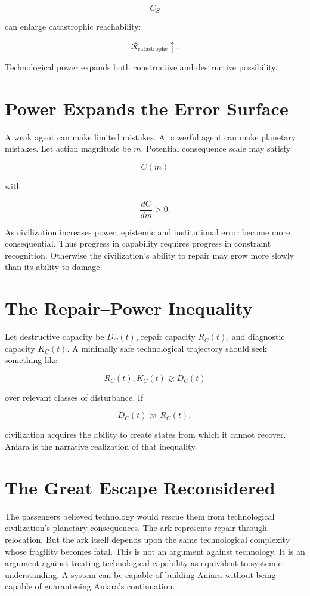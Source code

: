 \documentclass[11pt,oneside]{book}
\theoremstyle{definition}
\theoremstyle{remark}
\newcommand{\R}{\mathcal{R}}
\begin{document}
\[
C_S
\]

can enlarge catastrophic reachability:

\[
\R_{\mathrm{catastrophe}}\uparrow.
\]

Technological power expands both constructive and destructive possibility.

\section{Power Expands the Error Surface}

A weak agent can make limited mistakes. A powerful agent can make planetary mistakes. Let action
magnitude be \(m\). Potential consequence scale may satisfy

\[
C(m)
\]

with

\[
\frac{dC}{dm}>0.
\]

As civilization increases power, epistemic and institutional error become more consequential. Thus
progress in capability requires progress in constraint recognition. Otherwise the civilization's
ability to repair may grow more slowly than its ability to damage.

\section{The Repair--Power Inequality}

Let destructive capacity be \(D_C(t)\), repair capacity \(R_C(t)\), and diagnostic capacity
\(K_C(t)\). A minimally safe technological trajectory should seek something like

\[
R_C(t),K_C(t) \gtrsim D_C(t)
\]

over relevant classes of disturbance. If

\[
D_C(t)\gg R_C(t),
\]

civilization acquires the ability to create states from which it cannot recover. Aniara is the
narrative realization of that inequality.

\section{The Great Escape Reconsidered}

The passengers believed technology would rescue them from technological civilization's planetary
consequences. The ark represents repair through relocation. But the ark itself depends upon the same
technological complexity whose fragility becomes fatal. This is not an argument against technology.
It is an argument against treating technological capability as equivalent to systemic understanding.
A system can be capable of building Aniara without being capable of guaranteeing Aniara's
continuation.
\end{document}
